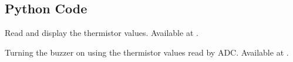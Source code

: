 \subsection{Python Code}
\label{sec:therm-pyhton-code}

\begin{pycode}
   {Read and display
    the thermistor values.  Available at
    .}
  \label{py:therm-read}
  
\end{pycode}

\begin{pycode}
  {Turning the buzzer on using the thermistor values read by
    ADC.  Available at .}
  \label{py:therm-buzzer}
  
\end{pycode}

